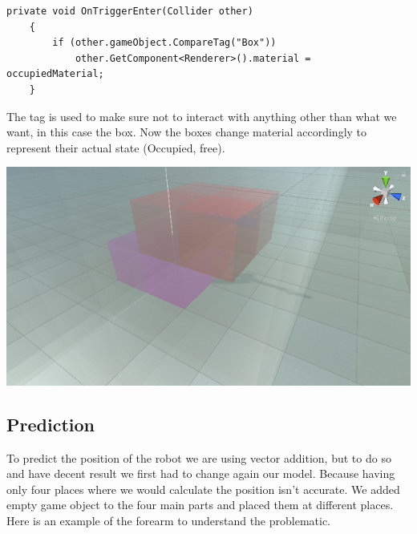 \documentclass{scrartcl}
\begin{document}
\begin{lstlisting}[language={[Sharp]C}]
  private void OnTriggerEnter(Collider other)
    {
        if (other.gameObject.CompareTag("Box"))
            other.GetComponent<Renderer>().material = occupiedMaterial;
    }

\end{lstlisting}

The tag is used to make sure not to interact with anything other than what we want, in this case the box. 
Now the boxes change material accordingly to represent their actual state (Occupied, free).

\includegraphics{collision}

\subsection{Prediction}

To predict the position of the robot we are using vector addition, but to do so and have decent result we first had to change again our model. 
Because having only four places where we would calculate the position isn’t accurate. We added empty game object to the four main parts and placed them at different places. 
Here is an example of the forearm to understand the problematic.
\end{document}
